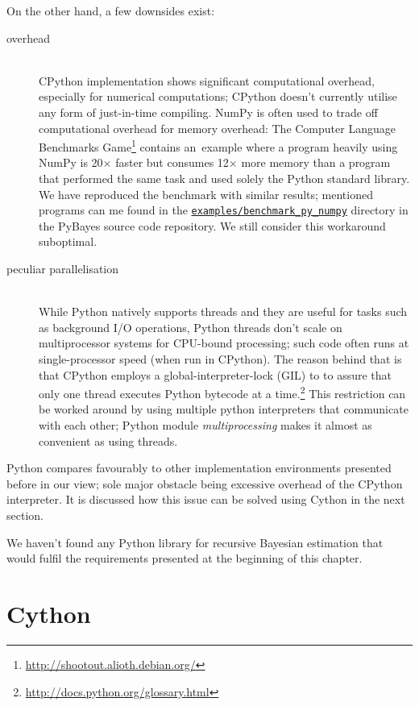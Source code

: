 On the other hand, a few downsides exist:
\begin{description}
	\item[overhead] \hfill \\
		CPython implementation shows significant computational overhead, especially for numerical
		computations; CPython doesn't currently utilise any form of just-in-time compiling.
		NumPy is often used to trade off computational overhead for memory overhead:
		The Computer Language Benchmarks Game\footnote{\url{http://shootout.alioth.debian.org/}}
		contains an~example where a program heavily using NumPy is 20\(\times\) faster but consumes
		12\(\times\) more memory than a program that performed the same task and used solely the
		Python standard library. We have reproduced the benchmark with similar results; mentioned
		programs can me found in the
		\href{http://github.com/strohel/PyBayes/tree/master/examples/benchmark_py_numpy}{\nolinkurl{examples/benchmark_py_numpy}}
		directory in the PyBayes source code repository. We still consider this workaround suboptimal.
	\item[peculiar parallelisation] \hfill \\
		While Python natively supports threads and they are useful for tasks such as background I/O
		operations, Python threads don't scale on multiprocessor systems for CPU-bound processing;
		such code often runs at single-processor speed (when run in CPython). The reason behind that
		is that CPython employs a global-interpreter-lock (GIL) to to assure that only one thread
		executes Python bytecode at a time.\footnote{\url{http://docs.python.org/glossary.html}} This
		restriction can be worked around by using multiple python interpreters that communicate with
		each other; Python module \emph{multiprocessing} makes it almost as convenient as using
		threads.
\end{description}
Python compares favourably to other implementation environments presented before in our view; sole
major obstacle being excessive overhead of the CPython interpreter. It is discussed how this issue
can be solved using Cython in the next section.

We haven't found any Python library for recursive Bayesian estimation that would fulfil the
requirements presented at the beginning of this chapter.

\section{Cython}

